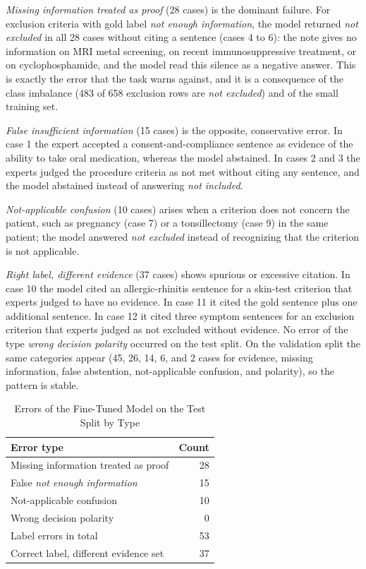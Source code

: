 \documentclass[conference]{IEEEtran}
\begin{document}
\emph{Missing information treated as proof} (28 cases) is the dominant failure. For exclusion criteria with gold label \emph{not enough information}, the model returned \emph{not excluded} in all 28 cases without citing a sentence (cases 4 to 6): the note gives no information on MRI metal screening, on recent immunosuppressive treatment, or on cyclophosphamide, and the model read this silence as a negative answer. This is exactly the error that the task warns against, and it is a consequence of the class imbalance (483 of 658 exclusion rows are \emph{not excluded}) and of the small training set.

\emph{False insufficient information} (15 cases) is the opposite, conservative error. In case 1 the expert accepted a consent-and-compliance sentence as evidence of the ability to take oral medication, whereas the model abstained. In cases 2 and 3 the experts judged the procedure criteria as not met without citing any sentence, and the model abstained instead of answering \emph{not included}.

\emph{Not-applicable confusion} (10 cases) arises when a criterion does not concern the patient, such as pregnancy (case 7) or a tonsillectomy (case 9) in the same patient; the model answered \emph{not excluded} instead of recognizing that the criterion is not applicable.

\emph{Right label, different evidence} (37 cases) shows spurious or excessive citation. In case 10 the model cited an allergic-rhinitis sentence for a skin-test criterion that experts judged to have no evidence. In case 11 it cited the gold sentence plus one additional sentence. In case 12 it cited three symptom sentences for an exclusion criterion that experts judged as not excluded without evidence. No error of the type \emph{wrong decision polarity} occurred on the test split. On the validation split the same categories appear (45, 26, 14, 6, and 2 cases for evidence, missing information, false abstention, not-applicable confusion, and polarity), so the pattern is stable.

\begin{table}[!t]
\caption{Errors of the Fine-Tuned Model on the Test Split by Type}
\label{tab:errtypes}
\centering
\footnotesize
\begin{tabular}{lr}
\toprule
Error type & Count \\
\midrule
Missing information treated as proof & 28 \\
False \emph{not enough information} & 15 \\
Not-applicable confusion & 10 \\
Wrong decision polarity & 0 \\
\midrule
Label errors in total & 53 \\
Correct label, different evidence set & 37 \\
\bottomrule
\end{tabular}
\end{table}
\end{document}
